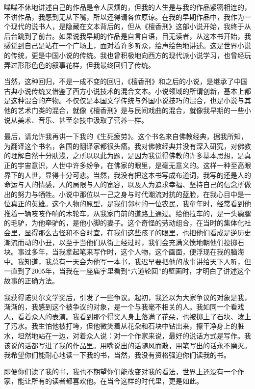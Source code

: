 \documentclass[fontset=fandol,12pt,a5paper]{ctexbook}
\begin{document}
喋喋不休地讲述自己的作品是令人厌烦的，但我的人生是与我的作品紧密相连的，不讲作品，我感到无从下嘴，所以还得请各位原谅。在我的早期作品中，我作为一个现代的说书人，是隐藏在文本背后的，但从《檀香刑》这部小说开始，我终于从后台跳到了前台。如果说我早期的作品是自言自语，目无读者，从这本书开始，我感觉到自己是站在一个广场上，面对着许多听众，绘声绘色地讲述。这是世界小说的传统，更是中国小说的传统。我也曾积极地向西方的现代派小说学习，也曾经玩弄过形形色色的叙事花样，但我最终回归了传统。

当然，这种回归，不是一成不变的回归，《檀香刑》和之后的小说，是继承了中国古典小说传统又借鉴了西方小说技术的混合文本。小说领域的所谓创新，基本上都是这种混合的产物。不仅仅是本国文学传统与外国小说技巧的混合，也是小说与其他的艺术门类的混合，就像《檀香刑》是与民间戏曲的混合，就像我早期的一些小说从美术、音乐、甚至杂技中汲取了营养一样。

最后，请允许我再讲一下我的《生死疲劳》。这个书名来自佛教经典，据我所知，为翻译这个书名，各国的翻译家都很头痛。我对佛教经典并没有深入研究，对佛教的理解自然十分肤浅，之所以以此为题，是因为我觉得佛教的许多基本思想，是真正的宇宙意识，人世中许多纷争，在佛家的眼里，是毫无意义的。这样一种至高眼界下的人世，显得十分可悲。当然，我没有把这本书写成布道词，我写的还是人的命运与人的情感，人的局限与人的宽容，以及人为追求幸福、坚持自己的信念所做出的努力与牺牲。小说中那位以一己之身与时代潮流对抗的蓝脸，在我心目中是一位真正的英雄。这个人物的原型，是我们邻村的一位农民，我童年时，经常看到他推着一辆吱吱作响的木轮车，从我家门前的道路上通过。给他拉车的，是一头瘸腿的毛驴，为他牵驴的，是他小脚的妻子。这个奇怪的劳动组合，在当时的集体化社会里，显得那么古怪和不合时宜，在我们这些孩子的眼里，也把他们看成是逆历史潮流而动的小丑，以至于当他们从街上经过时，我们会充满义愤地朝他们投掷石块。事过多年，当我拿起笔来写作时，这个人物，这个画面，便浮现在我的脑海中。我知道，我总有一天会为他写一本书，我迟早要把他的故事讲给天下人听，但一直到了2005年，当我在一座庙宇里看到“六道轮回”的壁画时，才明白了讲述这个故事的正确方法。

我获得诺贝尔文学奖后，引发了一些争议。起初，我还以为大家争议的对象是我，渐渐的，我感到这个被争议的对象，是一个与我毫不相关的人。我如同一个看戏人，看着众人的表演。我看到那个得奖人身上落满了花朵，也被掷上了石块、泼上了污水。我生怕他被打垮，但他微笑着从花朵和石块中钻出来，擦干净身上的脏水，坦然地站在一边，对着众人说：对一个作家来说，最好的说话方式是写作。我该说的话都写进了我的作品里。用嘴说出的话随风而散，用笔写出的话永不磨灭。我希望你们能耐心地读一下我的书，当然，我没有资格强迫你们读我的书。

即便你们读了我的书，我也不期望你们能改变对我的看法，世界上还没有一个作家，能让所有的读者都喜欢他。在当今这样的时代里，更是如此。
\end{document}
